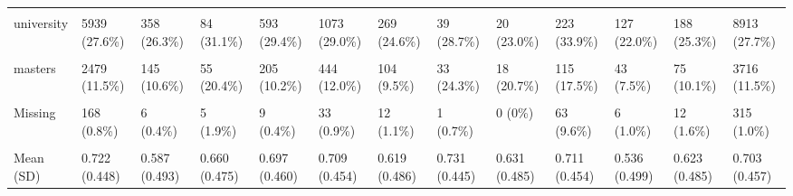 \documentclass[
  single column]{article}
\begin{document}
\begin{landscape}
\begin{longtable}[t]{lllllllllllll}
\cellcolor{gray!10}{cert\_5\_to\_6} & \cellcolor{gray!10}{2659 (12.3\%)} & \cellcolor{gray!10}{209 (15.3\%)} & \cellcolor{gray!10}{24 (8.9\%)} & \cellcolor{gray!10}{279 (13.8\%)} & \cellcolor{gray!10}{554 (15.0\%)} & \cellcolor{gray!10}{176 (16.1\%)} & \cellcolor{gray!10}{10 (7.4\%)} & \cellcolor{gray!10}{7 (8.0\%)} & \cellcolor{gray!10}{32 (4.9\%)} & \cellcolor{gray!10}{94 (16.3\%)} & \cellcolor{gray!10}{106 (14.2\%)} & \cellcolor{gray!10}{4150 (12.9\%)}\\
university & 5939 (27.6\%) & 358 (26.3\%) & 84 (31.1\%) & 593 (29.4\%) & 1073 (29.0\%) & 269 (24.6\%) & 39 (28.7\%) & 20 (23.0\%) & 223 (33.9\%) & 127 (22.0\%) & 188 (25.3\%) & 8913 (27.7\%)\\
\cellcolor{gray!10}{post\_grad} & \cellcolor{gray!10}{3120 (14.5\%)} & \cellcolor{gray!10}{176 (12.9\%)} & \cellcolor{gray!10}{39 (14.4\%)} & \cellcolor{gray!10}{276 (13.7\%)} & \cellcolor{gray!10}{565 (15.3\%)} & \cellcolor{gray!10}{129 (11.8\%)} & \cellcolor{gray!10}{26 (19.1\%)} & \cellcolor{gray!10}{13 (14.9\%)} & \cellcolor{gray!10}{39 (5.9\%)} & \cellcolor{gray!10}{58 (10.1\%)} & \cellcolor{gray!10}{87 (11.7\%)} & \cellcolor{gray!10}{4528 (14.1\%)}\\
\addlinespace
masters & 2479 (11.5\%) & 145 (10.6\%) & 55 (20.4\%) & 205 (10.2\%) & 444 (12.0\%) & 104 (9.5\%) & 33 (24.3\%) & 18 (20.7\%) & 115 (17.5\%) & 43 (7.5\%) & 75 (10.1\%) & 3716 (11.5\%)\\
\cellcolor{gray!10}{doctorate} & \cellcolor{gray!10}{835 (3.9\%)} & \cellcolor{gray!10}{42 (3.1\%)} & \cellcolor{gray!10}{24 (8.9\%)} & \cellcolor{gray!10}{54 (2.7\%)} & \cellcolor{gray!10}{158 (4.3\%)} & \cellcolor{gray!10}{47 (4.3\%)} & \cellcolor{gray!10}{8 (5.9\%)} & \cellcolor{gray!10}{8 (9.2\%)} & \cellcolor{gray!10}{57 (8.7\%)} & \cellcolor{gray!10}{4 (0.7\%)} & \cellcolor{gray!10}{9 (1.2\%)} & \cellcolor{gray!10}{1246 (3.9\%)}\\
Missing & 168 (0.8\%) & 6 (0.4\%) & 5 (1.9\%) & 9 (0.4\%) & 33 (0.9\%) & 12 (1.1\%) & 1 (0.7\%) & 0 (0\%) & 63 (9.6\%) & 6 (1.0\%) & 12 (1.6\%) & 315 (1.0\%)\\
\cellcolor{gray!10}{employed\_binary} & \cellcolor{gray!10}{} & \cellcolor{gray!10}{} & \cellcolor{gray!10}{} & \cellcolor{gray!10}{} & \cellcolor{gray!10}{} & \cellcolor{gray!10}{} & \cellcolor{gray!10}{} & \cellcolor{gray!10}{} & \cellcolor{gray!10}{} & \cellcolor{gray!10}{} & \cellcolor{gray!10}{} & \cellcolor{gray!10}{}\\
Mean (SD) & 0.722 (0.448) & 0.587 (0.493) & 0.660 (0.475) & 0.697 (0.460) & 0.709 (0.454) & 0.619 (0.486) & 0.731 (0.445) & 0.631 (0.485) & 0.711 (0.454) & 0.536 (0.499) & 0.623 (0.485) & 0.703 (0.457)\\

\end{longtable}
\end{landscape}
\end{document}
